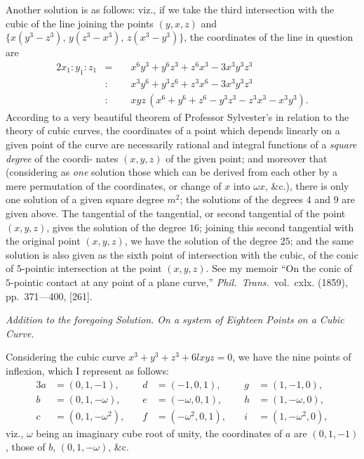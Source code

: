 \documentclass[11pt,a4paper]{article}
\begin{document}
Another solution is as follows: viz., if we take the third intersection with the
cubic of the line joining the points $(y, x, z)$ and $\{x(y^3-z^3),\, y(z^3-x^3),\, z(x^3-y^3)\}$, the
coordinates of the line in question are
\begin{alignat*}{2}
x_1 : y_1 : z_1 &=\; &&x^6y^3 + y^6z^3 + z^6x^3 - 3x^3y^3z^3\\
&:\; &&x^3y^6 + y^3z^6 + z^3x^6 - 3x^3y^3z^3\\
&:\; &&xyz\,(x^6+y^6+z^6 - y^3z^3 - z^3x^3 - x^3y^3).
\end{alignat*}
According to a very beautiful theorem of Professor Sylvester's in relation to the theory of
cubic curves, the coordinates of a point which depends linearly on a given point of the
curve are necessarily rational and integral functions of a \textit{square degree} of the coordi-
\noindent nates $(x, y, z)$ of the given point; and moreover that (considering as \textit{one} solution those
which can be derived from each other by a mere permutation of the coordinates, or
change of $x$ into $\omega x$, \&c.), there is only one solution of a given square degree $m^2$; the
solutions of the degrees $4$ and $9$ are given above. The tangential of the tangential, or
second tangential of the point $(x, y, z)$, gives the solution of the degree $16$; joining
this second tangential with the original point $(x, y, z)$, we have the solution of the
degree $25$; and the same solution is also given as the sixth point of intersection with
the cubic, of the conic of $5$-pointic intersection at the point $(x, y, z)$. See my memoir
``On the conic of $5$-pointic contact at any point of a plane curve,'' \textit{Phil.\ Trans.}\ vol.\ cxlx. (1859), pp.\ 371---400, [261].

\vspace{1em}
\begin{center}
\textit{Addition to the foregoing Solution. On a system of Eighteen Points on a Cubic Curve.}
\end{center}
\vspace{0.5em}

Considering the cubic curve $x^3+y^3+z^3+6lxyz=0$, we have the nine points of
inflexion, which I represent as follows:
\begin{alignat*}{3}
a &= (0, 1, -1), &\quad d &= (-1, 0, 1), &\quad g &= (1, -1, 0),\\
b &= (0, 1, -\omega), &\quad e &= (-\omega, 0, 1), &\quad h &= (1, -\omega, 0),\\
c &= (0, 1, -\omega^2), &\quad f &= (-\omega^2, 0, 1), &\quad i &= (1, -\omega^2, 0),
\end{alignat*}
viz., $\omega$ being an imaginary cube root of unity, the coordinates of $a$ are $(0, 1, -1)$, those
of $b$, $(0, 1, -\omega)$, \&c.
\end{document}
